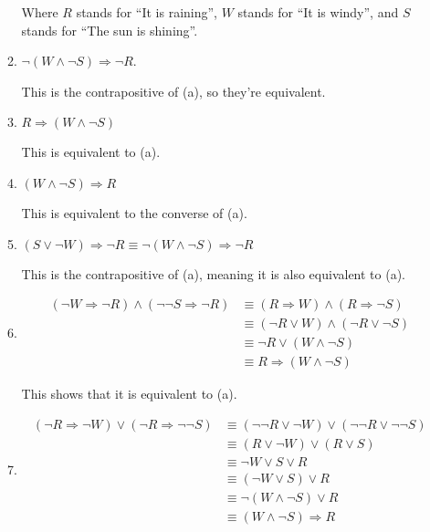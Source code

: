 \documentclass{article}
\begin{document}
\begin{enumerate}
\begin{enumerate}
    Where $R$ stands for ``It is raining'', $W$ stands for ``It is windy'', and $S$ stands for ``The sun is shining''.

  \item $\lnot (W \land \lnot S) \Rightarrow \lnot R$.

    This is the contrapositive of (a), so they're equivalent.

  \item $R \Rightarrow (W \land \lnot S)$

    This is equivalent to (a).

  \item $(W \land \lnot S) \Rightarrow R$

    This is equivalent to the converse of (a).

  \item $(S \lor \lnot W) \Rightarrow \lnot R \equiv \lnot (W \land \lnot S) \Rightarrow \lnot R$

    This is the contrapositive of (a), meaning it is also equivalent to (a).

  \item
    \begin{equation*}
      \begin{aligned}
        (\lnot W \Rightarrow \lnot R) \land (\lnot \lnot S \Rightarrow \lnot R) &\equiv (R \Rightarrow W) \land (R \Rightarrow \lnot S) \\
        &\equiv (\lnot R \lor W) \land (\lnot R \lor \lnot S) \\
        &\equiv \lnot R \lor (W \land \lnot S) \\
        &\equiv R \Rightarrow (W \land \lnot S)
      \end{aligned}
    \end{equation*}

    This shows that it is equivalent to (a).
  \item
    \begin{equation*}
      \begin{aligned}
        (\lnot R \Rightarrow \lnot W) \lor (\lnot R \Rightarrow \lnot \lnot S) &\equiv (\lnot \lnot R \lor \lnot W) \lor (\lnot \lnot R \lor \lnot \lnot S) \\
        &\equiv (R \lor \lnot W) \lor (R \lor S) \\
        &\equiv \lnot W \lor S \lor R \\
        &\equiv (\lnot W \lor S) \lor R \\
        &\equiv \lnot (W \land \lnot S) \lor R \\
        &\equiv (W \land \lnot S) \Rightarrow R
      \end{aligned}
    \end{equation*}


\end{enumerate}
\end{enumerate}
\end{document}
